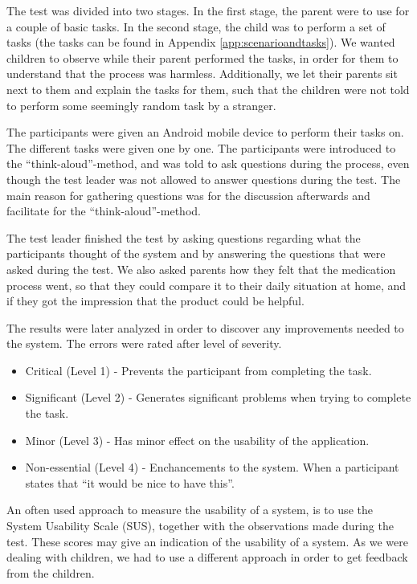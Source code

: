 The test was divided into two stages. In the first stage, the parent were to use \app{} for a couple of basic tasks. In the second stage, the child was to perform a set of tasks (the tasks can be found in Appendix \ref{app:scenarioandtasks}). We wanted children to observe while their parent performed the tasks, in order for them to understand that the process was harmless. Additionally, we let their parents sit next to them and explain the tasks for them, such that the children were not told to perform some seemingly random task by a stranger.    
 
The participants were given an Android mobile device to perform their tasks on. The different tasks were given one by one. The participants were introduced to the ``think-aloud''-method\cite{lewis1982using}, and was told to ask questions during the process, even though the test leader was not allowed to answer questions during the test. The main reason for gathering questions was for the discussion afterwards and facilitate for the ``think-aloud''-method. 

The test leader finished the test by asking questions regarding what the participants thought of the system and by answering the questions that were asked during the test. We also asked parents how they felt that the medication process went, so that they could compare it to their daily situation at home, and if they got the impression that the product could be helpful.  

The results were later analyzed in order to discover any improvements needed to the system. The errors were rated after level of severity\cite{dumas1995practical}. 

\begin{itemize}
\item{Critical (Level 1) - Prevents the participant from completing the task.}
\item{Significant (Level 2) - Generates significant problems when trying to complete the task.}
\item{Minor (Level 3) - Has minor effect on the usability of the application.}
\item{Non-essential (Level 4) - Enchancements to the system. When a participant states that ``it would be nice to have this''.}
\end{itemize}


An often used approach to measure the usability of a system, is to use the System Usability Scale (SUS)\cite{sus}, together with the observations made during the test. These scores may give an indication of the usability of a system\cite{susform}. As we were dealing with children, we had to use a different approach in order to get feedback from the children. 

